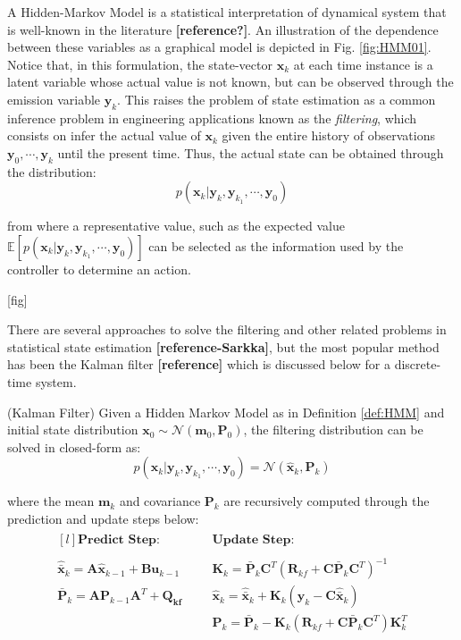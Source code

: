 \documentclass[a4paper,11pt]{book}
\numberwithin{figure}{chapter}
\numberwithin{equation}{chapter}
\numberwithin{table}{chapter}
\newtheorem{theorem}{Theorem}[chapter]
\theoremstyle{definition}
\newcounter{boxed-theorem}
\newenvironment{boxed-theorem}[1]
{\begin{shaded} \begin{theorem}{#1}}
{\end{theorem} \end{shaded}}
\newcounter{boxed-definition}
\begin{document}
A Hidden-Markov Model is a statistical interpretation of dynamical system that is well-known in the literature \textbf{[reference?]}. An illustration of the dependence between these variables as a graphical model is depicted in Fig. \ref{fig:HMM01}. Notice that, in this formulation, the state-vector $\bm{x}_k$ at each time instance is a latent variable whose actual value is not known, but can be observed through the emission variable $\bm{y}_k$. This raises the problem of state estimation as a common inference problem in engineering applications known as the \textit{filtering}, which consists on infer the actual value of $\bm{x}_k$ given the entire history of observations $\bm{y}_0, \cdots, \bm{y}_k$ until the present time. Thus, the actual state can be obtained through the distribution:
\begin{equation}
	p(\bm{x}_k | \bm{y}_{k}, \bm{y}_{k_1}, \cdots, \bm{y}_0)
\end{equation}

\noindent from where a representative value, such as the expected value $\mathbb{E}\left[ p(\bm{x}_k | \bm{y}_{k}, \bm{y}_{k_1}, \cdots, \bm{y}_0) \right]$ can be selected as the information used by the controller to determine an action.

[fig]

There are several approaches to solve the filtering and other related problems in statistical state estimation \textbf{[reference-Sarkka]}, but the most popular method has been the Kalman filter \textbf{[reference]} which is discussed below for a discrete-time system.

\begin{boxed-theorem}{(Kalman Filter)} \label{th:kalmanFilter}
	Given a Hidden Markov Model as in Definition \ref{def:HMM} and initial state distribution $\bm{x}_0 \sim \mathcal{N}(\bm{m}_0, \bm{P}_0)$, the filtering distribution can be solved in closed-form as:
	\begin{equation}
		p(\bm{x}_k | \bm{y}_{k}, \bm{y}_{k_1}, \cdots, \bm{y}_0)  = \mathcal{N}(\hat{\bm{x}}_k, \bm{P}_k)
	\end{equation}	 
	
	\noindent where the mean $\bm{m}_k$ and covariance $\bm{P}_k$ are recursively computed through the prediction and update steps below:
	\begin{align}
	\begin{matrix*}[l]
	\textbf{Predict Step:} & & & \textbf{Update Step:} \\ \\
	\hat{\bar{\bm{x}}}_k = \bm{A} \hat{\bm{x}}_{k-1} + \bm{B} \bm{u}_{k-1} & & & \bm{K}_k = \bar{\bm{P}}_k \bm{C}^T (\bm{R}_{kf} + \bm{C} \bar{\bm{P}}_k \bm{C}^T)^{-1} \\
	\bar{\bm{P}}_k = \bm{A} \bm{P}_{k-1} \bm{A}^T + \bm{Q_{kf}} & & & \hat{\bm{x}}_k = \hat{\bar{\bm{x}}}_k + \bm{K}_k(\bm{y}_k - \bm{C} \hat{\bar{\bm{x}}}_k)\ \\
	& & & \bm{P}_k = \bar{\bm{P}}_k - \bm{K}_k (\bm{R}_{kf} + \bm{C} \bar{\bm{P}}_k \bm{C}^T) \bm{K}_k^T
	\end{matrix*}	
	\end{align}
\end{boxed-theorem}
\end{document}

